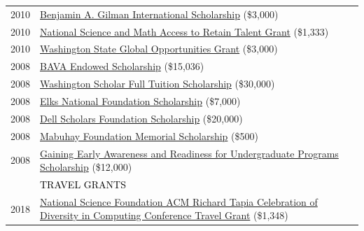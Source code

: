 \documentclass[12pt]{article}
\begin{document}
{\begin{longtable}{R{0.75in}p{5.0in}}
\footnotesize{2010} & \href{https://honors.uw.edu/news-archive/brief/?id=61}{Benjamin A. Gilman International Scholarship} (\$3,000)\\

\footnotesize{2010} & \href{https://web.archive.org/web/20210525151411/https://www2.ed.gov/programs/smart/index.html}{National Science and Math Access to Retain Talent Grant} (\$1,333)\\

\footnotesize{2010} & \href{https://www.washington.edu/studyabroad/students/resources/finances/scholarships/}{Washington State Global Opportunities Grant} (\$3,000)\\

\footnotesize{2008} & \href{https://web.archive.org/web/20200328042219/https://www.washington.edu/giving/recognition/rtc-2016/top-ten-lists/}{BAVA Endowed Scholarship} (\$15,036)\\

\footnotesize{2008} & \href{https://www.wsac.wa.gov/}{Washington Scholar Full Tuition Scholarship} (\$30,000)\\

\footnotesize{2008} & \href{https://www.elks.org/enf/scholars/}{Elks National Foundation Scholarship} (\$7,000)\\

\footnotesize{2008} & \href{https://www.dellscholars.org/}{Dell Scholars Foundation Scholarship} (\$20,000)\\

\footnotesize{2008} & \href{https://www.facebook.com/MabuhayFoundationinYKMValley}{Mabuhay Foundation Memorial Scholarship} (\$500)\\

\footnotesize{2008} & \href{https://www.ed.gov/grants-and-programs/grants-special-populations/grants-economically-disadvantaged-students/gaining-early-awareness-and-readiness-undergraduate-programs-gear-84334a84334s}{Gaining Early Awareness and Readiness for Undergraduate Programs Scholarship} (\$12,000) \medskip \\

& \large \textcolor{black}{\uppercase{Travel Grants}}\\

\footnotesize{2018} & \href{https://www.nsf.gov/awardsearch/show-award/?AWD_ID=1823052}{National Science Foundation ACM Richard Tapia Celebration of Diversity in Computing Conference Travel Grant} (\$1,348)\\


\end{longtable}}
\end{document}
